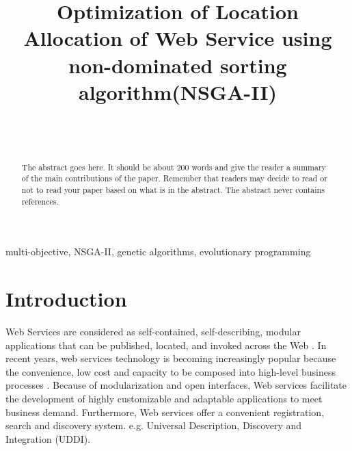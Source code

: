 \documentclass[twoside]{article}
\begin{document}
\title{\bf Optimization of Location Allocation of Web Service using non-dominated sorting algorithm(NSGA-II)
}  

\author{ \hfill {}\\ 
\AND
        \hfill {}\\
}

\maketitle

\begin{abstract}

The abstract goes here.  It should be about 200 words and give the
reader a summary of the main contributions of the paper.   
Remember that readers may decide to read or not to read your
paper based on what is in the abstract.  The abstract never
contains references.  

\end{abstract}

\begin{keywords}

multi-objective,
NSGA-II,
genetic algorithms, 
evolutionary programming

\end{keywords}
\section{Introduction}
Web Services are considered as self-contained, self-describing, modular applications that can be published, located, and invoked across the Web \cite{Ran:2003:MWS:844357.844360}. 
In recent years, web services technology is becoming increasingly popular because the convenience, low cost and capacity to be composed into high-level business processes \cite{Aboolian200964}.
Because of modularization and open interfaces, Web services facilitate the development of highly 
customizable and adaptable applications to meet business demand. Furthermore, Web services offer a 
convenient registration, search  and discovery system. e.g. Universal Description, Discovery and Integration (UDDI). 
\end{document}
